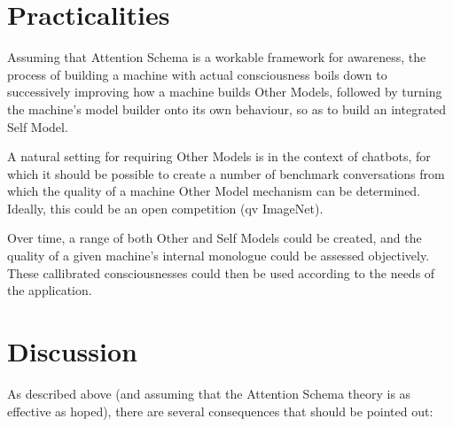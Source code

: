 \documentclass[citeauthoryear]{llncs}
\begin{document}

\section{Practicalities}


Assuming that Attention Schema is a workable framework for awareness,
the process of building a machine with actual consciousness boils down
to successively improving how a machine builds Other Models, 
followed by turning the machine's model builder onto its own behaviour,
so as to build an integrated Self Model.

A natural setting for requiring Other Models is in the context of chatbots,
for which it should be possible to create a number of benchmark conversations 
from which the quality of a machine Other Model mechanism can be determined.  
Ideally, this could be an open competition (qv ImageNet).

Over time, a range of both Other and Self Models could be created, 
and the quality of a given machine's internal monologue could be assessed objectively.
These callibrated consciousnesses could then be used according to the needs of
the application.


\section{Discussion}

As described above (and assuming that the Attention Schema theory
is as effective as hoped), there are several consequences that should
be pointed out:
\end{document}

